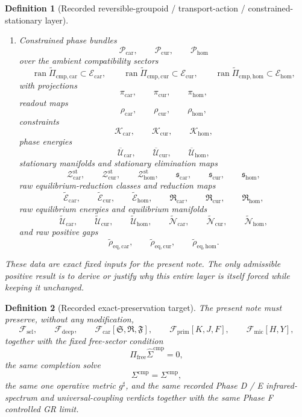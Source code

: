 \documentclass[11pt]{article}
\newcommand{\CompletedMetric}{g^{\sharp}}
\newcommand{\CompShift}{\Sigma^{\mathrm{cmp}}}
\newcommand{\CompLift}{\widehat\Sigma^{\mathrm{cmp}}}
\newcommand{\FreeProj}{\Pi_{\mathrm{free}}}
\newcommand{\GaugeAux}{Y}
\newcommand{\MicFunctional}{\mathscr F_{\mathrm{mic}}}
\newcommand{\PrimFunctional}{\mathscr F_{\mathrm{prim}}}
\newcommand{\CarrierFunctional}{\mathscr F_{\mathrm{car}}}
\newcommand{\DeepFunctional}{\mathscr F_{\mathrm{deep}}}
\newcommand{\StemFunctional}{\mathscr F_{\mathrm{sel}}}
\newcommand{\PrimStrain}{K}
\newcommand{\PrimNeutral}{J}
\newcommand{\PrimFree}{F}
\newcommand{\CarrierSeed}{\mathfrak S}
\newcommand{\RelabelSeed}{\mathfrak R}
\newcommand{\FreeSeed}{\mathfrak F}
\newcommand{\TensorEqClass}{\mathscr E_{\mathrm{car}}}
\newcommand{\CurEqClass}{\mathscr E_{\mathrm{cur}}}
\newcommand{\HomEqClass}{\mathscr E_{\mathrm{hom}}}
\newcommand{\TensorEqCmpProj}{\widetilde\Pi_{\mathrm{cmp,car}}}
\newcommand{\CurEqCmpProj}{\widetilde\Pi_{\mathrm{cmp,cur}}}
\newcommand{\HomEqCmpProj}{\widetilde\Pi_{\mathrm{cmp,hom}}}
\newcommand{\TensorRawEqClass}{\widetilde{\mathscr E}_{\mathrm{car}}}
\newcommand{\CurRawEqClass}{\widetilde{\mathscr E}_{\mathrm{cur}}}
\newcommand{\HomRawEqClass}{\widetilde{\mathscr E}_{\mathrm{hom}}}
\newcommand{\TensorEqReduce}{\mathfrak R_{\mathrm{car}}}
\newcommand{\CurEqReduce}{\mathfrak R_{\mathrm{cur}}}
\newcommand{\HomEqReduce}{\mathfrak R_{\mathrm{hom}}}
\newcommand{\TensorRawEnergy}{\widetilde{\mathcal U}_{\mathrm{car}}}
\newcommand{\CurRawEnergy}{\widetilde{\mathcal U}_{\mathrm{cur}}}
\newcommand{\HomRawEnergy}{\widetilde{\mathcal U}_{\mathrm{hom}}}
\newcommand{\TensorRawEqManifold}{\widetilde{\mathcal N}_{\mathrm{car}}}
\newcommand{\CurRawEqManifold}{\widetilde{\mathcal N}_{\mathrm{cur}}}
\newcommand{\HomRawEqManifold}{\widetilde{\mathcal N}_{\mathrm{hom}}}
\newcommand{\RawCarGap}{\widetilde\rho_{\mathrm{eq,car}}}
\newcommand{\RawCurGap}{\widetilde\rho_{\mathrm{eq,cur}}}
\newcommand{\RawHomGap}{\widetilde\rho_{\mathrm{eq,hom}}}
\newcommand{\TensorPhaseClass}{\mathscr P_{\mathrm{car}}}
\newcommand{\CurPhaseClass}{\mathscr P_{\mathrm{cur}}}
\newcommand{\HomPhaseClass}{\mathscr P_{\mathrm{hom}}}
\newcommand{\TensorPhaseProj}{\pi_{\mathrm{car}}}
\newcommand{\CurPhaseProj}{\pi_{\mathrm{cur}}}
\newcommand{\HomPhaseProj}{\pi_{\mathrm{hom}}}
\newcommand{\TensorPhaseRead}{\rho_{\mathrm{car}}}
\newcommand{\CurPhaseRead}{\rho_{\mathrm{cur}}}
\newcommand{\HomPhaseRead}{\rho_{\mathrm{hom}}}
\newcommand{\TensorConstraint}{\mathcal K_{\mathrm{car}}}
\newcommand{\CurConstraint}{\mathcal K_{\mathrm{cur}}}
\newcommand{\HomConstraint}{\mathcal K_{\mathrm{hom}}}
\newcommand{\TensorPhaseEnergy}{\overline{\mathcal U}_{\mathrm{car}}}
\newcommand{\CurPhaseEnergy}{\overline{\mathcal U}_{\mathrm{cur}}}
\newcommand{\HomPhaseEnergy}{\overline{\mathcal U}_{\mathrm{hom}}}
\newcommand{\TensorStationaryManifold}{\mathcal Z_{\mathrm{car}}^{\mathrm{st}}}
\newcommand{\CurStationaryManifold}{\mathcal Z_{\mathrm{cur}}^{\mathrm{st}}}
\newcommand{\HomStationaryManifold}{\mathcal Z_{\mathrm{hom}}^{\mathrm{st}}}
\newcommand{\TensorStationarySolve}{\mathfrak s_{\mathrm{car}}}
\newcommand{\CurStationarySolve}{\mathfrak s_{\mathrm{cur}}}
\newcommand{\HomStationarySolve}{\mathfrak s_{\mathrm{hom}}}
\newtheorem{definition}{Definition}
\begin{document}
\begin{definition}[Recorded reversible-groupoid / transport-action / constrained-stationary layer]
\begin{enumerate}
    \item Constrained phase bundles
    \[
    \TensorPhaseClass,\qquad
    \CurPhaseClass,\qquad
    \HomPhaseClass
    \]
    over the ambient compatibility sectors
    \[
    \operatorname{ran}\TensorEqCmpProj\subset\TensorEqClass,\qquad
    \operatorname{ran}\CurEqCmpProj\subset\CurEqClass,\qquad
    \operatorname{ran}\HomEqCmpProj\subset\HomEqClass,
    \]
    with projections
    \[
    \TensorPhaseProj,\qquad
    \CurPhaseProj,\qquad
    \HomPhaseProj,
    \]
    readout maps
    \[
    \TensorPhaseRead,\qquad
    \CurPhaseRead,\qquad
    \HomPhaseRead,
    \]
    constraints
    \[
    \TensorConstraint,\qquad
    \CurConstraint,\qquad
    \HomConstraint,
    \]
    phase energies
    \[
    \TensorPhaseEnergy,\qquad
    \CurPhaseEnergy,\qquad
    \HomPhaseEnergy,
    \]
    stationary manifolds and stationary elimination maps
    \[
    \TensorStationaryManifold,\qquad
    \CurStationaryManifold,\qquad
    \HomStationaryManifold,
    \qquad
    \TensorStationarySolve,\qquad
    \CurStationarySolve,\qquad
    \HomStationarySolve,
    \]
    raw equilibrium-reduction classes and reduction maps
    \[
    \TensorRawEqClass,\qquad
    \CurRawEqClass,\qquad
    \HomRawEqClass,
    \qquad
    \TensorEqReduce,\qquad
    \CurEqReduce,\qquad
    \HomEqReduce,
    \]
    raw equilibrium energies and equilibrium manifolds
    \[
    \TensorRawEnergy,\qquad
    \CurRawEnergy,\qquad
    \HomRawEnergy,
    \qquad
    \TensorRawEqManifold,\qquad
    \CurRawEqManifold,\qquad
    \HomRawEqManifold,
    \]
    and raw positive gaps
    \[
    \RawCarGap,\qquad
    \RawCurGap,\qquad
    \RawHomGap.
    \]
\end{enumerate}
These data are exact fixed inputs for the present note. The only admissible positive result is to derive or justify why this entire layer is itself forced while keeping it unchanged.
\end{definition}

\begin{definition}[Recorded exact-preservation target]
\label{def:recorded_target}
The present note must preserve, without any modification,
\begin{equation}
\StemFunctional,
\qquad
\DeepFunctional,
\qquad
\CarrierFunctional[\CarrierSeed,\RelabelSeed,\FreeSeed],
\qquad
\PrimFunctional[\PrimStrain,\PrimNeutral,\PrimFree],
\qquad
\MicFunctional[H,\GaugeAux],
\label{eq:target_functionals}
\end{equation}
together with the fixed free-sector condition
\begin{equation}
\FreeProj\CompLift=0,
\label{eq:target_free}
\end{equation}
the same completion solve
\begin{equation}
\CompShift=\Sigma^{\mathrm{cmp}},
\label{eq:target_sigma}
\end{equation}
the same one operative metric \(\CompletedMetric\), and the same recorded Phase D / E infrared-spectrum and universal-coupling verdicts together with the same Phase F controlled GR limit.
\end{definition}
\end{document}
